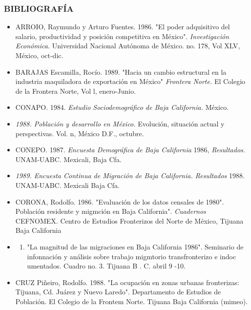 \documentclass{article}
\begin{document}
\subsubsection{\textbf{BIBLIOGRAFÍA}}
\begin{itemize}
\item 
ARROIO, Raymundo y Arturo Fuentes. 1986. "El poder adquisitivo del salario, productividad y posición competitiva en México". \textit{Investigación Económica.} Universidad Nacional Autónoma de México. no. 178, Vol XLV, México, oct-dic.

\item 
BARAJAS Escamilla, Rocío. 1989. "Hacia un cambio estructural en la industria maquiladora de exportación en México" \textit{Frontera Norte.} El Colegio de la Frontera Norte, Vol l, enero-Junio.

\item 
CONAPO. 1984. \textit{Estudio Sociodemográfico de Baja California.} México.

\item 
\textit{1988. Población y desarrollo en México.} Evolución, situación actual y perspectivas. Vol. n, México D.F., octubre.

\item 
CONEPO. 1987. \textit{Encuesta Demográfica de Baja California} 1986, \textit{Resultados.} UNAM-UABC. Mexicali, Baja Cfa.

\item 
\textit{1989. Encuesta Continua de Migración de Baja California. Resultados} 1988. UNAM-UABC. Mexicali Baja Cfa.

\item 
CORONA, Rodolfo. 1986. "Evaluación de los datos censales de 1980". Población residente y migmción en Baja California". \textit{Cuadernos}  CEFNOMEX. Centro de Estudios Fronterizos del Norte de México, Tijuana Baja California

\item \begin{enumerate}
\item 
"La magnitud de las migraciones en Baja California 1986". Seminario de infonnación y análisis sobre trabajo migmtorio transfronterizo e indoc umentados. Cuadro no. 3. Tijuana B . C. abril 9 -10.

\end{enumerate}

\item 
CRUZ Piñeiro, Rodolfo. 1988. "La ocupación en zonas urbanas fronterizas: Tijuana, Cd. Juárez y Nuevo Laredo". Departamento de Estudios de Población. El Colegio de la Frontem Norte. Tijuana Baja California (mimeo).


\end{itemize}
\end{document}
